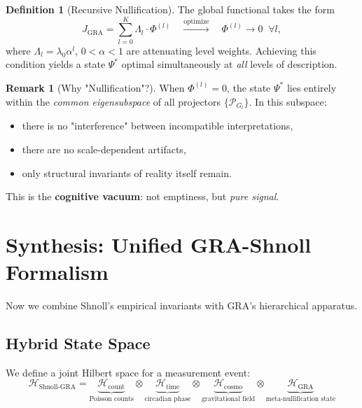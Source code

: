 \documentclass[12pt,a4paper]{article}
\theoremstyle{plain}
\theoremstyle{definition}
\newtheorem{definition}[theorem]{Definition}
\newtheorem{remark}[theorem]{Remark}
\theoremstyle{remark}
\newcommand{\GRA}{\text{GRA}}
\newcommand{\shnoll}{\text{Shnoll}}
\newcommand{\cH}{\mathcal{H}}
\newcommand{\cP}{\mathcal{P}}
\begin{document}
\begin{definition}[Recursive Nullification]
The global functional takes the form
\begin{equation}
    J_{\GRA} = \sum_{l=0}^{K} \Lambda_l \cdot \Phi^{(l)} 
    \quad \xrightarrow{\text{optimize}} \quad 
    \Phi^{(l)} \to 0 \;\; \forall l,
    \label{eq:gra-objective}
\end{equation}
where $\Lambda_l = \lambda_0 \alpha^l$, $0 < \alpha < 1$ are attenuating level weights. Achieving this condition yields a state $\Psi^*$ optimal simultaneously at \emph{all} levels of description.
\end{definition}

\begin{remark}[Why "Nullification"?]
When $\Phi^{(l)} = 0$, the state $\Psi^*$ lies entirely within the \emph{common eigensubspace} of all projectors $\{\cP_{G_l}\}$. In this subspace:
\begin{itemize}
    \item there is no "interference" between incompatible interpretations,
    \item there are no scale-dependent artifacts,
    \item only structural invariants of reality itself remain.
\end{itemize}
This is the \textbf{cognitive vacuum}: not emptiness, but \emph{pure signal}.
\end{remark}

\section{Synthesis: Unified GRA-Shnoll Formalism}
\label{sec:synthesis}

Now we combine Shnoll's empirical invariants with GRA's hierarchical apparatus.

\subsection{Hybrid State Space}

We define a joint Hilbert space for a measurement event:
\begin{equation}
\boxed{
\cH_{\shnoll\text{-}\GRA} = 
\underbrace{\cH_{\text{count}}}_{\text{Poisson counts}} \otimes 
\underbrace{\cH_{\text{time}}}_{\text{circadian phase}} \otimes 
\underbrace{\cH_{\text{cosmo}}}_{\text{gravitational field}} \otimes 
\underbrace{\cH_{\GRA}}_{\text{meta-nullification state}}
}
\label{eq:hybrid-space}
\end{equation}
\end{document}
